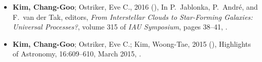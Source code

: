 \documentclass[12pt,preprint,letter]{aastex63_mod}
\begin{document}
\begin{itemize}[itemsep=1pt]








\end{itemize}

\begin{itemize}[itemsep=1pt]
\item \textbf{Kim, Chang-Goo}; Ostriker, Eve C., 2016 (), In P.~{Jablonka},
  P.~{Andr{\'e}}, and F.~{van der Tak}, editors, {\em From Interstellar Clouds
  to Star-Forming Galaxies: Universal Processes?}, volume 315 of {\em IAU
  Symposium}, pages 38--41, .
\item \textbf{Kim, Chang-Goo}; Ostriker, Eve C.; Kim, Woong-Tae, 2015 (),
  Highlights of Astronomy, 16:609--610, March 2015, .
\end{itemize}

\end{document}
